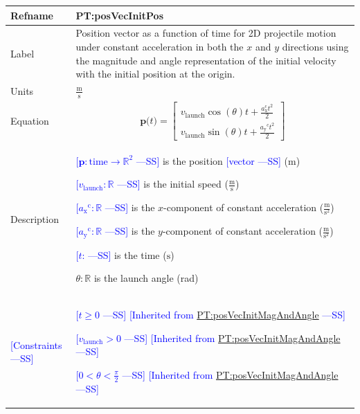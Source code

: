 \documentclass[12pt]{article}
\newcommand{\authornote}[3]{\textcolor{#1}{[#3 ---#2]}}
\newcommand{\authornote}[3]{}
\newcommand{\wss}[1]{\authornote{blue}{SS}{#1}}
\begin{document}
\noindent \begin{minipage}{\textwidth}
\begin{tabular}{>{\raggedright}p{}>{\raggedright\arraybackslash}p{}}
\toprule \textbf{Refname} & \textbf{PT:posVecInitPos} 
\label{PT:posVecInitPos} \\ \midrule Label & Position vector as a function of
time for 2D projectile motion under constant acceleration in both the $x$ and
$y$ directions using the magnitude and angle representation of the initial
velocity with the initial position at the origin.
        
\\ \midrule
Units & $\frac{\text{m}}{\text{s}}$
        
\\ \midrule
Equation & \begin{displaymath}
           \symbf{p}\text{(}t\text{)}=\begin{bmatrix}
                                      {v}_{\text{launch}} \cos(\theta) t +\frac{a_\text{x}^\text{c} t^2}{2}\\
                                      {v}_{\text{launch}} \sin(\theta) t +\frac{{{a_{\text{y}}}^{\text{c}}} t^{2}}{2}
                                      \end{bmatrix}
           \end{displaymath}
\\ \midrule
Description & \begin{symbDescription}
              \item{\wss{$\symbf{p}: \text{time} \rightarrow \mathbb{R}^2$} is the position \wss{vector} (${\text{m}}$)}
              \item{\wss{${{v}_{\text{launch}}}: \mathbb{R}$} is the initial speed ($\frac{\text{m}}{\text{s}}$)}
              \item{\wss{${{a_{\text{x}}}^{\text{c}}}: \mathbb{R}$} is the $x$-component of constant acceleration ($\frac{\text{m}}{\text{s}^{2}}$)}
              \item{\wss{${{a_{\text{y}}}^{\text{c}}}: \mathbb{R}$} is the $y$-component of constant acceleration ($\frac{\text{m}}{\text{s}^{2}}$)}
              \item{\wss{$t$: \text{time}} is the time (${\text{s}}$)}
              \item $\theta: \mathbb{R}$ is the launch angle (rad)
              \end{symbDescription}

\\ \midrule
\wss{Constraints} & 
\begin{symbDescription}
\item \wss{$t \geq 0$} \wss{Inherited from \hyperref[PT:posVecInitMagAndAngle]{PT:posVecInitMagAndAngle}}
\item \wss{$v_\text{launch} > 0$} \wss{Inherited from \hyperref[PT:posVecInitMagAndAngle]{PT:posVecInitMagAndAngle}}
\item \wss{$
0 < \theta < \frac{\pi}{2}$} \wss{Inherited from \hyperref[PT:posVecInitMagAndAngle]{PT:posVecInitMagAndAngle}}
\end{symbDescription}


\end{tabular}
\end{minipage}
\end{document}
